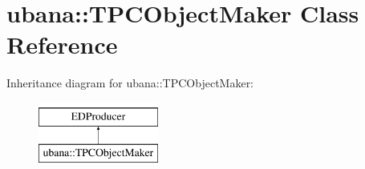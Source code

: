 \hypertarget{classubana_1_1TPCObjectMaker}{\section{ubana\-:\-:T\-P\-C\-Object\-Maker Class Reference}
\label{classubana_1_1TPCObjectMaker}
}
Inheritance diagram for ubana\-:\-:T\-P\-C\-Object\-Maker\-:\begin{figure}[H]
\begin{center}
\leavevmode
\includegraphics[height=2.000000cm]{classubana_1_1TPCObjectMaker}
\end{center}
\end{figure}
